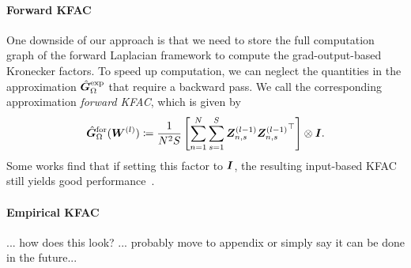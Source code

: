 \paragraph{Forward KFAC}
One downside of our approach is that we need to store the full computation graph of the forward Laplacian framework to compute the grad-output-based Kronecker factors.
To speed up computation, we can neglect the quantities in the approximation $\hat{{\bm{G}}}_\Omega^{\textup{exp}}$ that require a backward pass.
We call the corresponding approximation \emph{forward KFAC}, which is given by
\begin{align}
    \hat{{\bm{G}}}_\Omega^{\textup{for}}({\bm{W}}^{(l)})
    \coloneqq \frac{1}{N^2 S}
    \left[\sum_{n=1}^N \sum_{s=1}^S {\bm{Z}}^{(l-1)}_{n,s}{{\bm{Z}}^{(l-1)}_{n,s}}^\top \right]
    \otimes
    {\bm{I}}.
\end{align}
Some works find that if setting this factor to ${\bm{I}}$, the resulting input-based KFAC still yields good performance~\cite{benzing2022gradient,petersen2023isaac}.

\paragraph{Empirical KFAC}
... how does this look? ...
probably move to appendix or simply say it can be done in the future...






